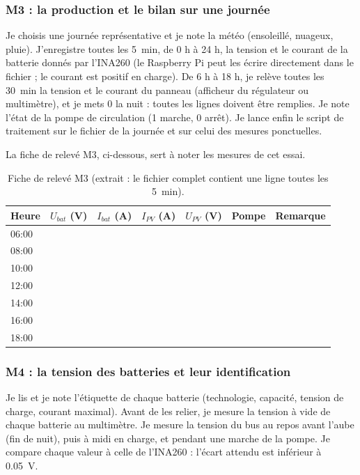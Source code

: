 \subsubsection*{M3 : la production et le bilan sur une journée}

Je choisis une journée représentative et je note la météo (ensoleillé, nuageux, pluie). J'enregistre toutes les \qty{5}{min}, de 0 h à 24 h, la tension et le courant de la batterie donnés par l'INA260 (le Raspberry Pi peut les écrire directement dans le fichier ; le courant est positif en charge). De 6 h à 18 h, je relève toutes les \qty{30}{min} la tension et le courant du panneau (afficheur du régulateur ou multimètre), et je mets 0 la nuit : toutes les lignes doivent être remplies. Je note l'état de la pompe de circulation (1 marche, 0 arrêt). Je lance enfin le script de traitement sur le fichier de la journée et sur celui des mesures ponctuelles.

La fiche de relevé M3, ci-dessous, sert à noter les mesures de cet essai.

\begin{table}[H]
\centering
\small
\begin{tabular}{|p{1.4cm}|p{2.0cm}|p{2.0cm}|p{2.0cm}|p{2.0cm}|p{1.4cm}|p{2.0cm}|}
\hline
\textbf{Heure} & \textbf{$U_{bat}$ (V)} & \textbf{$I_{bat}$ (A)} & \textbf{$I_{PV}$ (A)} & \textbf{$U_{PV}$ (V)} & \textbf{Pompe} & \textbf{Remarque} \\
\hline
06:00 & & & & & & \\
\hline
08:00 & & & & & & \\
\hline
10:00 & & & & & & \\
\hline
12:00 & & & & & & \\
\hline
14:00 & & & & & & \\
\hline
16:00 & & & & & & \\
\hline
18:00 & & & & & & \\
\hline
\end{tabular}
\caption{Fiche de relevé M3 (extrait : le fichier complet contient une ligne toutes les \qty{5}{min}).}
\end{table}

\subsubsection*{M4 : la tension des batteries et leur identification}

Je lis et je note l'étiquette de chaque batterie (technologie, capacité, tension de charge, courant maximal). Avant de les relier, je mesure la tension à vide de chaque batterie au multimètre. Je mesure la tension du bus au repos avant l'aube (fin de nuit), puis à midi en charge, et pendant une marche de la pompe. Je compare chaque valeur à celle de l'INA260 : l'écart attendu est inférieur à \qty{0,05}{V}.

